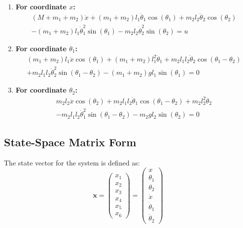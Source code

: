 \documentclass[12pt]{article}
\begin{document}
	\begin{enumerate}
		\item \textbf{For coordinate $x$:}
		\begin{align*}
			(M \!+\! m_1 \!+\! m_2) \ddot{x} + (m_1 \!+\! m_2) l_1 \ddot{\theta}_1 \cos(\theta_1) + m_2 l_2 \ddot{\theta}_2 \cos(\theta_2) \\ 
			- (m_1 \!+\! m_2) l_1 \dot{\theta}_1^2 \sin(\theta_1) - m_2 l_2 \dot{\theta}_2^2 \sin(\theta_2) = u
		\end{align*}
		
		\item \textbf{For coordinate $\theta_1$:}
		\begin{align*}
			(m_1 \!+\! m_2) l_1 \ddot{x} \cos(\theta_1) + (m_1 \!+\! m_2) l_1^2 \ddot{\theta}_1 + m_2 l_1 l_2 \ddot{\theta}_2 \cos(\theta_1 \!-\! \theta_2) \\
			+ m_2 l_1 l_2 \dot{\theta}_2^2 \sin(\theta_1 \!-\! \theta_2) - (m_1 \!+\! m_2) g l_1 \sin(\theta_1) = 0
		\end{align*}
		
		\item \textbf{For coordinate $\theta_2$:}
		\begin{align*}
			m_2 l_2 \ddot{x} \cos(\theta_2) + m_2 l_1 l_2 \ddot{\theta}_1 \cos(\theta_1 \!-\! \theta_2) + m_2 l_2^2 \ddot{\theta}_2 \\
			- m_2 l_1 l_2 \dot{\theta}_1^2 \sin(\theta_1 \!-\! \theta_2) - m_2 g l_2 \sin(\theta_2) = 0
		\end{align*}
	\end{enumerate}
	
	\subsection{State-Space Matrix Form}
	
	The state vector for the system is defined as:
	\begin{equation}
		\mathbf{x} = \begin{pmatrix} x_1 \\ x_2 \\ x_3 \\ x_4 \\ x_5 \\ x_6 \end{pmatrix} = \begin{pmatrix} x \\ \theta_1 \\ \theta_2 \\ \dot{x} \\ \dot{\theta}_1 \\ \dot{\theta}_2 \end{pmatrix}
	\end{equation}
	
\end{document}
